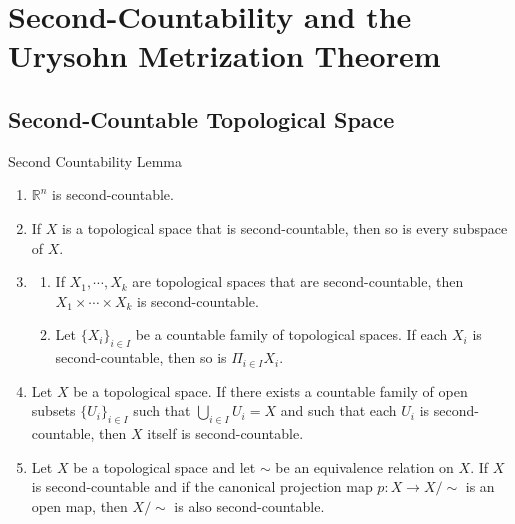 \chapter{Second-Countability and the Urysohn Metrization Theorem}

\section{Second-Countable Topological Space}

\begin{lemma}{Second Countability Lemma}\\
\begin{enumerate}
    \item $\mathbb{R}^n$ is second-countable.
    \item If $X$ is a topological space that is second-countable, then so is every subspace of $X$.
    \item \begin{enumerate}
        \item If $X_1 ,\cdots, X_k$ are topological spaces that are second-countable, then $X_1 \times \cdots \times X_k$ is second-countable.
        \item Let $\{X_i\}_{i \in I}$ be a countable family of topological spaces. If each $X_i$ is second-countable, then so is $\Pi_{i \in I}X_i$.
    \end{enumerate}
    \item Let $X$ be a topological space. If there exists a countable family of open subsets $\{U_{i}\}_{i \in I}$ such that $\bigcup_{i \in I} U_i=X$ and such that each $U_i$ is second-countable, then $X$ itself is second-countable.
    \item Let $X$ be a topological space and let $\sim$ be an equivalence relation on $X$. If $X$ is second-countable and if the canonical projection map $p: X \to X/\sim$ is an open map, then $X/\sim$ is also second-countable.
\end{enumerate}
\end{lemma}

